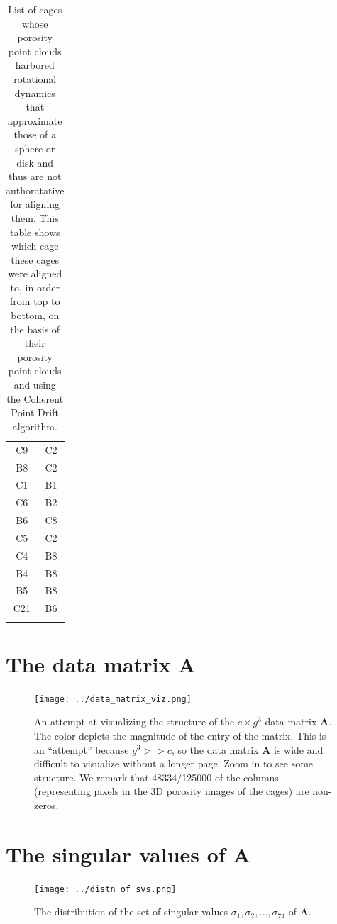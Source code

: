 \documentclass[journal=jacsat,manuscript=article]{achemso}
\begin{document}
{\begin{longtable}{cc}
 C9 & C2\\
 B8 & C2\\
 C1 & B1\\
 C6 & B2\\
 B6 & C8\\
 C5 & C2\\
 C4 & B8\\
 B4 & B8\\
 B5 & B8\\
 C21 & B6\\
    \hline
          \caption{\color{red}List of cages whose porosity point clouds harbored rotational dynamics that approximate those of a sphere or disk and thus are not authoratative for aligning them. This table shows which cage these cages were aligned to, in order from top to bottom, on the basis of their porosity point clouds and using the Coherent Point Drift algorithm.}
  \label{tbl:aligned_via_coherent_point_drift}
\end{longtable}

} %

\clearpage
\newpage

\section{The data matrix $\mathbf{A}$}

\begin{figure}
\centering
	\texttt{[image: ../data\_matrix\_viz.png]}
	\caption{An attempt at visualizing the structure of the $c \times g^3$ data matrix $\mathbf{A}$. The color depicts the magnitude of the entry of the matrix. This is an ``attempt'' because $g^3>>c$, so the data matrix $\mathbf{A}$ is wide and difficult to visualize without a longer page. Zoom in to see some structure. We remark that 48334/125000 of the columns (representing pixels in the 3D porosity images of the cages) are non-zeros.
	} \label{fig:data_matrix}
\end{figure}

\newpage
\clearpage

\section{The singular values of $\mathbf{A}$}

\begin{figure}
\centering
	\texttt{[image: ../distn\_of\_svs.png]}
	\caption{The distribution of the set of singular values $\sigma_1,\sigma_2, ..., \sigma_{74}$ of $\mathbf{A}$.
	} \label{fig:distn_of_svs}
\end{figure}
\end{document}
